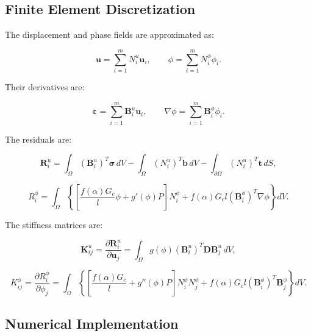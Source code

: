 \documentclass[11pt,a4paper]{article}
\begin{document}
\subsection{Finite Element Discretization}

The displacement and phase fields are approximated as:

\begin{equation}
\bm{u}
=
\sum_{i=1}^{m}
N_i^u \bm{u}_i,
\qquad
\phi
=
\sum_{i=1}^{m}
N_i^{\phi}\phi_i .
\end{equation}

Their derivatives are:

\begin{equation}
\bm{\varepsilon}
=
\sum_{i=1}^{m}
\bm{B}_i^u \bm{u}_i,
\qquad
\nabla \phi
=
\sum_{i=1}^{m}
\bm{B}_i^{\phi}\phi_i .
\end{equation}

The residuals are:

\begin{equation}
\bm{R}_i^u
=
\int_{\Omega}
(\bm{B}_i^u)^T
\bm{\sigma}
\,dV
-
\int_{\Omega}
(N_i^u)^T
\bm{b}
\,dV
-
\int_{\partial\Omega}
(N_i^u)^T
\bm{t}
\,dS ,
\end{equation}

\begin{equation}
R_i^{\phi}
=
\int_{\Omega}
\left\{
\left[
\frac{f(\alpha)G_c}{l}\phi
+
 g'(\phi)P
\right]N_i^{\phi}
+
 f(\alpha)G_cl
(\bm{B}_i^{\phi})^T
\nabla \phi
\right\}dV .
\end{equation}

The stiffness matrices are:

\begin{equation}
\bm{K}_{ij}^u
=
\frac{\partial \bm{R}_i^u}{\partial \bm{u}_j}
=
\int_{\Omega}
g(\phi)
(\bm{B}_i^u)^T
\bm{D}
\bm{B}_j^u
\,dV ,
\end{equation}

\begin{equation}
K_{ij}^{\phi}
=
\frac{\partial R_i^{\phi}}{\partial \phi_j}
=
\int_{\Omega}
\left\{
\left[
\frac{f(\alpha)G_c}{l}
+
 g''(\phi)P
\right]
N_i^{\phi}N_j^{\phi}
+
 f(\alpha)G_cl
(\bm{B}_i^{\phi})^T
\bm{B}_j^{\phi}
\right\}dV .
\end{equation}

\subsection{Numerical Implementation}
\end{document}
